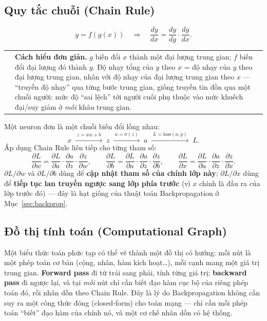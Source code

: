 \documentclass[12pt,a4paper]{article}
\makeatletter
\newenvironment{tructiep}[1][Cách hiểu đơn giản]
  {\par\smallskip\noindent\begin{tabular}{@{}p{0.35em}@{\hspace{6pt}}p{\dimexpr\linewidth-1.9em\relax}@{}}
   \textcolor{boxln}{\rule{2pt}{\baselineskip}} & \textbf{#1.}\enspace\ignorespaces}
  {\end{tabular}\par\smallskip}
\makeatother
\begin{document}
\subsection{Quy tắc chuỗi (Chain Rule)}
\label{sec:chainrule}

$$y = f(g(x)) \quad\Longrightarrow\quad \frac{dy}{dx} = \frac{dy}{dg}\cdot\frac{dg}{dx}.$$

\begin{tructiep}
$g$ biến đổi $x$ thành một đại lượng trung gian; $f$ biến đổi đại lượng đó
thành $y$. Độ nhạy tổng của $y$ theo $x$ = độ nhạy của $y$ theo đại lượng
trung gian, nhân với độ nhạy của đại lượng trung gian theo $x$ --- ``truyền
độ nhạy'' qua từng bước trung gian, giống truyền tin đồn qua một chuỗi
người: mức độ ``sai lệch'' tới người cuối phụ thuộc vào mức khuếch đại/suy
giảm ở \emph{mỗi} khâu trung gian.
\end{tructiep}

Một neuron đơn là một chuỗi biến đổi lồng nhau:
$$x \;\xrightarrow{\;z=wx+b\;}\; z \;\xrightarrow{\;a=\sigma(z)\;}\; a \;\xrightarrow{\;L=\mathrm{loss}(a,y)\;}\; L.$$
Áp dụng Chain Rule liên tiếp cho từng tham số:
$$\frac{\partial L}{\partial w} = \frac{\partial L}{\partial a}\cdot\frac{\partial a}{\partial z}\cdot\frac{\partial z}{\partial w}, \qquad
\frac{\partial L}{\partial b} = \frac{\partial L}{\partial a}\cdot\frac{\partial a}{\partial z}\cdot\frac{\partial z}{\partial b}, \qquad
\frac{\partial L}{\partial x} = \frac{\partial L}{\partial a}\cdot\frac{\partial a}{\partial z}\cdot\frac{\partial z}{\partial x}.$$
$\partial L/\partial w$ và $\partial L/\partial b$ dùng để \textbf{cập nhật
tham số của chính lớp này}; $\partial L/\partial x$ dùng để \textbf{tiếp
tục lan truyền ngược sang lớp phía trước} (vì $x$ chính là đầu ra của lớp
trước đó) --- đây là hạt giống của thuật toán Backpropagation ở
Mục~\ref{sec:backprop}.

\subsection{Đồ thị tính toán (Computational Graph)}
\label{sec:compgraph}

Một biểu thức toán phức tạp có thể vẽ thành một đồ thị có hướng: mỗi nút là
một phép toán cơ bản (cộng, nhân, hàm kích hoạt\ldots), mỗi cạnh mang một
giá trị trung gian. \textbf{Forward pass} đi từ trái sang phải, tính từng
giá trị; \textbf{backward pass} đi ngược lại, và tại \emph{mỗi} nút chỉ cần
biết đạo hàm cục bộ của riêng phép toán đó, rồi nhân dồn theo Chain Rule.
Đây là lý do Backpropagation không cần suy ra một công thức đóng
(closed-form) cho toàn mạng --- chỉ cần mỗi phép toán ``biết'' đạo hàm của
chính nó, và một cơ chế nhân dồn có hệ thống.
\end{document}
